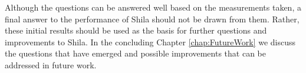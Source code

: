 Although the questions can be answered well based on the measurements taken, a final answer to the performance of Shila should not be drawn from them. Rather, these initial results should be used as the basis for further questions and improvements to Shila. In the concluding Chapter \ref{chap:FutureWork} we discuss the questions that have emerged and possible improvements that can be addressed in future work.  